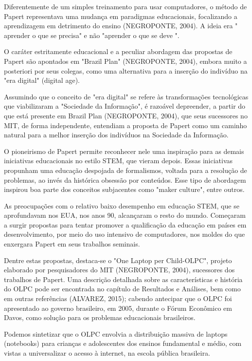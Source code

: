 Diferentemente de um simples treinamento para usar computadores, o método de Papert representava uma mudança em paradigmas educacionais, focalizando a aprendizagem em detrimento do ensino  (NEGROPONTE, 2004). A ideia era " aprender o que se precisa" e não "aprender o que se deve ".

O caráter estritamente educacional e a peculiar abordagem das propostas de Papert são apontados em "Brazil Plan" (NEGROPONTE, 2004), embora muito a posteriori por seus colegas, como uma alternativa para a inserção do indivíduo na "era digital" (digital age).

Assumindo que o conceito de "era digital" se refere às transformações tecnológicas que viabilizaram a "Sociedade da Informação",  é razoável depreender, a partir do que está presente em Brazil Plan  (NEGROPONTE, 2004), que seus sucessores no MIT, de forma independente, entendiam a proposta de Papert como um caminho natural para a melhor inserção dos indivíduos na Sociedade da Informação.

O pioneirismo de Papert permite reconhecer nele uma inspiração para as demais iniciativas educacionais no estilo STEM, que vieram depois. Essas iniciativas propunham uma educação despojada de formalismos, voltada para a resolução de problemas, ao invés da histórica obsessão por conteúdos. Esse tipo de abordagem inspirou boa parte dos conceitos subjacentes como "maker culture", entre outros.

As preocupações com o relativo baixo desempenho em  educação STEM, que se aprofundavam nos EUA, nos anos 90, alcançaram o resto do mundo. Começaram a surgir propostas para tentar promover a qualificação da educação em países em desenvolvimento, por meio do uso intensivo de computadores, nos moldes do que enxergara Papert em seus trabalhos seminais.

Dentre estas propostas, destaca-se o "One Laptop per Child-OLPC", projeto elaborado por pesquisadores do MIT  (NEGROPONTE, 2004), sucessores dos trabalhos de Papert. Uma descrição detalhada sobre as características e história do OLPC pode ser encontrada no capítulo de Resultados e Análises, bem como em outras referências (ALVAREZ, 2015); cabendo antecipar que o OLPC foi apresentado ao governo brasileiro, em 2005, durante o Fórum Econômico em Davos, como solução para os problemas educacionais brasileiros.

Podemos sintetizar que o OLPC envolvia a distribuição massiva de laptops (notebooks) para crianças e adolescentes dos ensinos fundamental e médio, com vistas a universalizar o acesso à internet, na escola pública brasileira.

